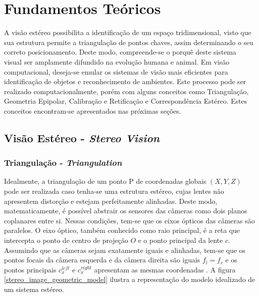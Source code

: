 \chapter{Fundamentos Teóricos}
\label{Revisão Bibliográfica}

A visão estéreo possibilita a identificação de um espaço tridimensional, visto que sua estrutura permite a triangulação de pontos chaves, assim determinando o seu correto posicionamento. Deste modo, compreende-se o porquê deste sistema visual ser amplamente difundido na evolução humana e animal. Em visão computacional, deseja-se emular os sistemas de visão mais eficientes para identificação de objetos e reconhecimento de ambientes. Este processo pode ser realizado  computacionalmente, porém com alguns conceitos como Triangulação, Geometria Epipolar, Calibração e Retificação e Correspondência Estéreo. Estes conceitos encontram-se apresentados nas próximas seções.


\section{Visão Estéreo - \textit{Stereo Vision}}
\subsection{Triangulação - \textit{Triangulation}}

Idealmente, a triangulação de um ponto P de coordenadas globais $(X,Y,Z)$ pode ser realizada caso tenha-se uma estrutura estéreo, cujas lentes não apresentem distorção e estejam perfeitamente alinhadas. Deste modo, matematicamente, é possível abstrair os sensores das câmeras como dois planos coplanares entre si. Nessas condições, tem-se que os eixos ópticos das câmeras são paralelos. O eixo óptico, também conhecido como raio principal, é a reta que intercepta o ponto de centro de projeção ${O}$ e o ponto principal da lente ${c}$. Assumindo que as câmeras sejam exatamente iguais e alinhadas, tem-se que os pontos focais da câmera esquerda e da câmera direita são iguais ${f_l = f_r}$ e os pontos principais ${c^{left}_x}$ e  ${c^{right}_x}$ apresentam as mesmas coordenadas \cite{Bradski2008}. A figura \ref{stereo_image_geometric_model} ilustra a representação do modelo idealizado de um sistema estéreo.

